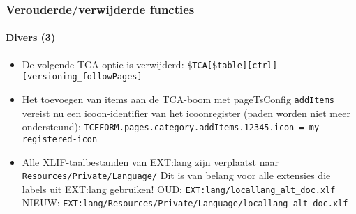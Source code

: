 \begin{frame}[fragile]
	\frametitle{Verouderde/verwijderde functies}
	\framesubtitle{Divers (3)}


	\begin{itemize}

		\item De volgende TCA-optie is verwijderd:\newline
			\texttt{\$TCA[\$table][ctrl][versioning\_followPages]}

		\item Het toevoegen van items aan de TCA-boom met pageTsConfig \texttt{addItems} vereist nu een icoon-identifier
			van het icoonregister (paden worden niet meer ondersteund):\newline
			\smaller
				\texttt{TCEFORM.pages.category.addItems.12345.icon = my-registered-icon}
			\normalsize

		\item \underline{Alle} XLIF-taalbestanden van EXT:lang zijn verplaatst naar\newline
			\texttt{Resources/Private/Language/}\newline
			Dit is van belang voor alle extensies die labels uit EXT:lang gebruiken!\newline
			\smaller
				OUD: \texttt{EXT:lang/locallang\_alt\_doc.xlf}\newline
				NIEUW: \texttt{EXT:lang/Resources/Private/Language/locallang\_alt\_doc.xlf}
			\normalsize

	\end{itemize}

\end{frame}

